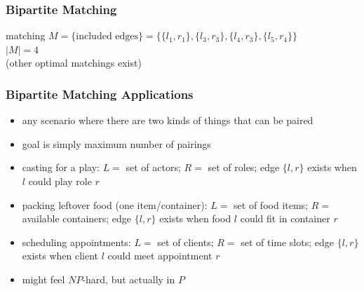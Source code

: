 \documentclass[10pt,aspectratio=169]{beamer}
\begin{document}
\begin{frame} \frametitle{Bipartite Matching}
\begin{center}

  matching $M = \{\text{included edges}\}
    = \{ \{l_1, r_1\}, \{l_3, r_3\}, \{l_4, r_3\}, \{l_5, r_4\} \}$ \\

    $|M|=4$ \\

    (other optimal matchings exist)
\end{center}
\end{frame}

\begin{frame} \frametitle{Bipartite Matching Applications}
\begin{itemize}
  \item any scenario where there are two kinds of things that can be paired
  \item goal is simply maximum number of pairings
  \item casting for a play: $L = $ set of actors; $R = $ set of roles;
    edge $\{l, r\}$ exists when $l$ could play role $r$
  \item packing leftover food (one item/container): $L = $ set of food items; $R = $ available
    containers; edge $\{l, r\}$ exists when food $l$ could fit in container $r$
  \item scheduling appointments: $L = $ set of clients; $R = $ set of time slots;
    edge $\{l, r \}$ exists when client $l$ could meet appointment $r$
  \item might feel $NP$-hard, but actually in $P$
\end{itemize}
\end{frame}
\end{document}

